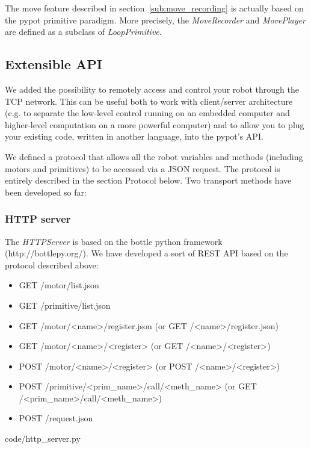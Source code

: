 The move feature described in section~\ref{sub:move_recording} is actually based on the pypot primitive paradigm. More precisely, the \emph{MoveRecorder} and \emph{MovePlayer} are defined as a subclass of \emph{LoopPrimitive}.

\subsection{Extensible API} %

We added the possibility to remotely access and control your robot through the TCP network. This can be useful both to work with client/server architecture (e.g. to separate the low-level control running on an embedded computer and higher-level computation on a more powerful computer) and to allow you to plug your existing code, written in another language, into the pypot’s API.

We defined a protocol that allows all the robot variables and methods (including motors and primitives) to be accessed via a JSON request. The protocol is entirely described in the section Protocol below. Two transport methods have been developed so far:

\subsubsection{HTTP server} %

The \emph{HTTPServer }is based on the bottle python framework (http://bottlepy.org/). We have developed a sort of REST API based on the protocol described above:

\begin{itemize}
    \item GET /motor/list.json
    \item GET /primitive/list.json
    \item GET /motor/<name>/register.json (or GET /<name>/register.json)
    \item GET /motor/<name>/<register> (or GET /<name>/<register>)
    \item POST /motor/<name>/<register> (or POST /<name>/<register>)
    \item POST /primitive/<prim\_name>/call/<meth\_name> (or GET /<prim\_name>/call/<meth\_name>)
    \item POST /request.json
\end{itemize}



    {code/http_server.py}


